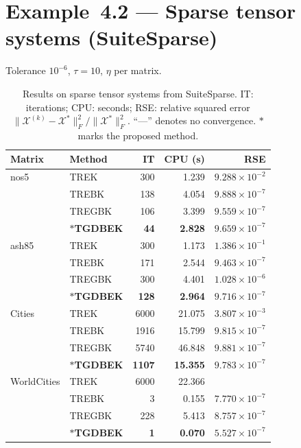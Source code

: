 \documentclass[11pt,a4paper]{article}
\begin{document}
\section*{Example~4.2 — Sparse tensor systems (SuiteSparse)}
Tolerance $10^{-6}$, $\tau=10$, $\eta$ per matrix.

\begin{table}[ht]
\centering
\caption{Results on sparse tensor systems from SuiteSparse. IT: iterations; CPU: seconds; RSE: relative squared error $\|\mathcal{X}^{(k)}-\mathcal{X}^*\|_F^2/\|\mathcal{X}^*\|_F^2$. ``---'' denotes no convergence. $*$ marks the proposed method.}
\label{tab:sparse}
\begin{tabular}{llrrr}
\toprule
Matrix & Method & IT & CPU (s) & RSE \\
\midrule
nos5 & TREK & 300 & 1.239 & $9.288\times 10^{-2}$ \\
 & TREBK & 138 & 4.054 & $9.888\times 10^{-7}$ \\
 & TREGBK & 106 & 3.399 & $9.559\times 10^{-7}$ \\
 & $*$\textbf{TGDBEK} & \textbf{44} & \textbf{2.828} & \textbf{$9.659\times 10^{-7}$} \\
\midrule
ash85 & TREK & 300 & 1.173 & $1.386\times 10^{-1}$ \\
 & TREBK & 171 & 2.544 & $9.463\times 10^{-7}$ \\
 & TREGBK & 300 & 4.401 & $1.028\times 10^{-6}$ \\
 & $*$\textbf{TGDBEK} & \textbf{128} & \textbf{2.964} & \textbf{$9.716\times 10^{-7}$} \\
\midrule
Cities & TREK & 6000 & 21.075 & $3.807\times 10^{-3}$ \\
 & TREBK & 1916 & 15.799 & $9.815\times 10^{-7}$ \\
 & TREGBK & 5740 & 46.848 & $9.881\times 10^{-7}$ \\
 & $*$\textbf{TGDBEK} & \textbf{1107} & \textbf{15.355} & \textbf{$9.783\times 10^{-7}$} \\
\midrule
WorldCities & TREK & 6000 & 22.366 & \text{---} \\
 & TREBK & 3 & 0.155 & $7.770\times 10^{-7}$ \\
 & TREGBK & 228 & 5.413 & $8.757\times 10^{-7}$ \\
 & $*$\textbf{TGDBEK} & \textbf{1} & \textbf{0.070} & \textbf{$5.527\times 10^{-7}$} \\
\bottomrule
\end{tabular}
\end{table}
\end{document}
